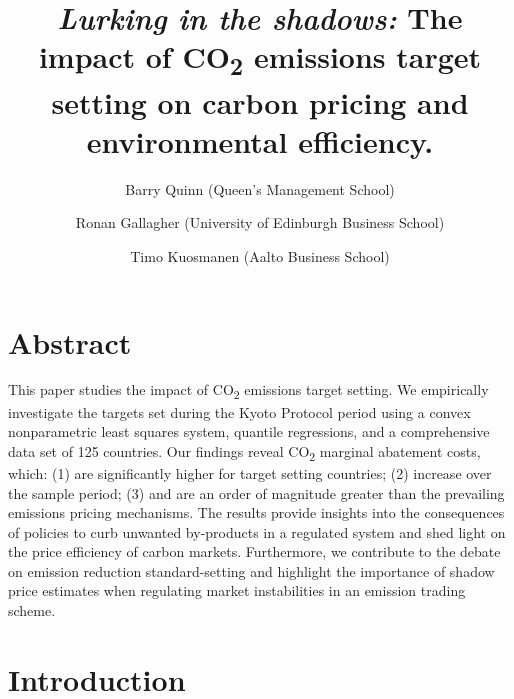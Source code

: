 \documentclass[
  letterpaper,
  DIV=11,
  numbers=noendperiod]{scrartcl}
\title{\emph{Lurking in the shadows:} The impact of CO\textsubscript{2}
emissions target setting on carbon pricing and environmental
efficiency.}
\author{Barry Quinn (Queen's Management School) \and Ronan Gallagher
(University of Edinburgh Business School) \and Timo Kuosmanen (Aalto
Business School)}
\date{}
\begin{document}
\maketitle

\ifdefined\Shaded\renewenvironment{Shaded}{\begin{tcolorbox}[borderline west={3pt}{0pt}{shadecolor}, boxrule=0pt, frame hidden, enhanced, interior hidden, breakable, sharp corners]}{\end{tcolorbox}}\fi

\hypertarget{abstract}{%
\section{Abstract}\label{abstract}}

This paper studies the impact of CO\textsubscript{2} emissions target
setting. We empirically investigate the targets set during the Kyoto
Protocol period using a convex nonparametric least squares system,
quantile regressions, and a comprehensive data set of 125 countries. Our
findings reveal CO\textsubscript{2} marginal abatement costs, which: (1)
are significantly higher for target setting countries; (2) increase over
the sample period; (3) and are an order of magnitude greater than the
prevailing emissions pricing mechanisms. The results provide insights
into the consequences of policies to curb unwanted by-products in a
regulated system and shed light on the price efficiency of carbon
markets. Furthermore, we contribute to the debate on emission reduction
standard-setting and highlight the importance of shadow price estimates
when regulating market instabilities in an emission trading scheme.

\newpage

\hypertarget{introduction}{%
\section{Introduction}\label{introduction}}
\end{document}
